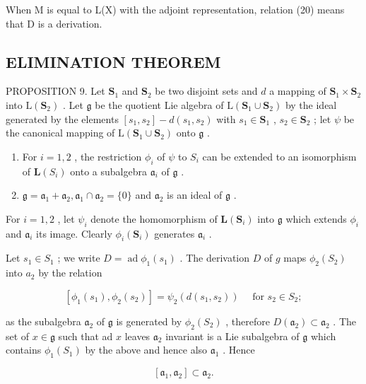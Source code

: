 When M is equal to L(X) with the adjoint representation, relation (20) means that D is a derivation.

\subsection{ELIMINATION THEOREM}

PROPOSITION 9. Let \(\mathbf{S}_1\) and \(\mathbf{S}_2\) be two disjoint sets and \(d\) a mapping of \(\mathbf{S}_1 \times \mathbf{S}_2\) into \(\mathrm{L}(\mathbf{S}_2)\) . Let \(\mathfrak{g}\) be the quotient Lie algebra of \(\mathrm{L}(\mathbf{S}_1 \cup \mathbf{S}_2)\) by the ideal generated by the elements \([s_1, s_2] - d(s_1, s_2)\) with \(s_1 \in \mathbf{S}_1\) , \(s_2 \in \mathbf{S}_2\) ; let \(\psi\) be the canonical mapping of \(\mathrm{L}(\mathbf{S}_1 \cup \mathbf{S}_2)\) onto \(\mathfrak{g}\) .

\begin{enumerate}
\def\labelenumi{(\alph{enumi})}
\item
  For \(i = 1,2\) , the restriction \(\phi_{i}\) of \(\psi\) to \(S_{i}\) can be extended to an isomorphism of \(\mathbf{L}(S_i)\) onto a subalgebra \(\mathfrak{a}_i\) of \(\mathfrak{g}\) .
\item
  \(\mathfrak{g} = \mathfrak{a}_1 + \mathfrak{a}_2, \mathfrak{a}_1 \cap \mathfrak{a}_2 = \{0\}\) and \(\mathfrak{a}_2\) is an ideal of \(\mathfrak{g}\) .
\end{enumerate}

For \(i = 1,2\) , let \(\psi_{i}\) denote the homomorphism of \(\mathbf{L}(\mathbf{S}_i)\) into \(\mathfrak{g}\) which extends \(\phi_i\) and \(\mathfrak{a}_i\) its image. Clearly \(\phi_i(\mathbf{S}_i)\) generates \(\mathfrak{a}_i\) .

Let \(s_1 \in S_1\) ; we write \(D = \operatorname{ad} \phi_1(s_1)\) . The derivation \(D\) of \(g\) maps \(\phi_2(S_2)\) into \(a_2\) by the relation

\[
[ \phi_ {1} (s _ {1}), \phi_ {2} (s _ {2}) ] = \psi_ {2} (d (s _ {1}, s _ {2})) \quad \text { for } s _ {2} \in S _ {2};
\]

as the subalgebra \(\mathfrak{a}_2\) of \(\mathfrak{g}\) is generated by \(\phi_2(S_2)\) , therefore \(D(\mathfrak{a}_2) \subset \mathfrak{a}_2\) . The set of \(x \in \mathfrak{g}\) such that ad \(x\) leaves \(\mathfrak{a}_2\) invariant is a Lie subalgebra of \(\mathfrak{g}\) which contains \(\phi_1(S_1)\) by the above and hence also \(\mathfrak{a}_1\) . Hence

\[
\left[ \mathfrak {a} _ {1}, \mathfrak {a} _ {2} \right] \subset \mathfrak {a} _ {2}.\tag{23}
\]

